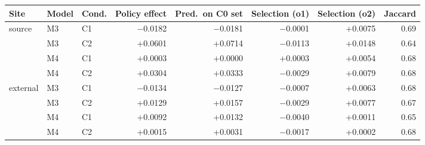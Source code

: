 \begin{tabular}{lllrrrrr}
\toprule
Site & Model & Cond. & Policy effect & Pred.\ on C0 set & Selection (o1) & Selection (o2) & Jaccard\\
\midrule
source & M3 & C1 & $-$0.0182 & $-$0.0181 & $-$0.0001 & +0.0075 & 0.69\\
 & M3 & C2 & +0.0601 & +0.0714 & $-$0.0113 & +0.0148 & 0.64\\
 & M4 & C1 & +0.0003 & +0.0000 & +0.0003 & +0.0054 & 0.68\\
 & M4 & C2 & +0.0304 & +0.0333 & $-$0.0029 & +0.0079 & 0.68\\
\addlinespace
external & M3 & C1 & $-$0.0134 & $-$0.0127 & $-$0.0007 & +0.0063 & 0.68\\
 & M3 & C2 & +0.0129 & +0.0157 & $-$0.0029 & +0.0077 & 0.67\\
 & M4 & C1 & +0.0092 & +0.0132 & $-$0.0040 & +0.0011 & 0.65\\
 & M4 & C2 & +0.0015 & +0.0031 & $-$0.0017 & +0.0002 & 0.68\\
\bottomrule
\end{tabular}
